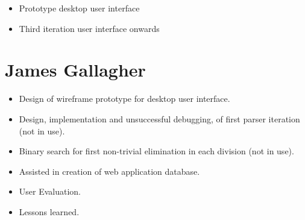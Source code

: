 \begin{itemize}
\item Prototype desktop user interface
\item Third iteration user interface onwards
\end{itemize}

\section{James Gallagher}

\begin{itemize}
\item Design of wireframe prototype for desktop user interface.
\item Design, implementation and unsuccessful debugging, of first parser iteration (not in use).
\item Binary search for first non-trivial elimination in each division (not in use).
\item Assisted in creation of web application database. 
\item User Evaluation. 
\item Lessons learned. 
 
\end{itemize}
